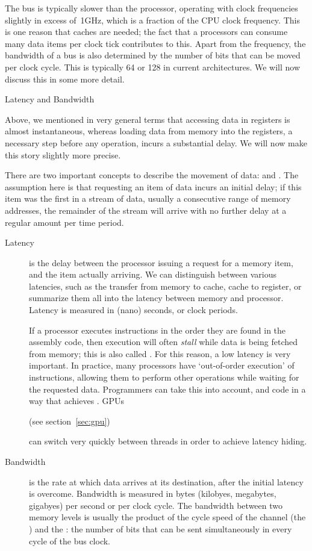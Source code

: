 The bus is typically slower than the processor, operating with clock
frequencies slightly in excess of~1GHz, which is a fraction of the CPU
clock frequency.  This is one reason that caches are needed; the fact
that a processors can consume many data items per clock tick
contributes to this. Apart from the frequency, the bandwidth of a bus is
also determined by the number of bits that can be moved per clock
cycle. This is typically 64 or 128 in current architectures. We will
now discuss this in some more detail.

 {Latency and Bandwidth}
\label{sec:latencybandwidth}

Above, we mentioned in very general terms that accessing data in
registers is almost instantaneous, whereas loading data from memory
into the registers, a necessary step before any operation, incurs a
substantial delay. We will now make this story slightly more precise.

There are two important concepts to describe the movement of data:
 and . The assumption here is
that requesting an item of data incurs an initial delay; if this item
was the first in a stream of data, usually a consecutive range of
memory addresses, the remainder of the stream will arrive with no
further delay
at a regular amount per time period.
\begin{description}
\item[Latency] is the delay between the processor issuing a request
  for a memory item, and the item actually arriving. We can
  distinguish between various latencies, such as the transfer from
  memory to cache, cache to register, or summarize them all into the
  latency between memory and processor. Latency is measured in (nano)
  seconds, or clock periods.

  If a processor executes instructions in the order they are found in
  the assembly code, then execution will often \emph{stall} while
  data is being fetched from memory; this is also called
  . For this reason, a low latency is very
  important. In practice, many processors have `out-of-order
  execution' of instructions, allowing them to perform other
  operations while waiting for the requested data. Programmers can
  take this into account, and code in a way that achieves
  . 
  \acp{GPU} 
\begin{gpu}
  (see section~\ref{sec:gpu})  
\end{gpu}
  can switch very quickly between threads in order to achieve latency hiding.
\item[Bandwidth] is the rate at which data arrives at its destination,
  after the initial latency is overcome. Bandwidth is measured in
  bytes (kilobyes, megabytes, gigabyes) per second or per clock cycle.
  The bandwidth between two memory levels is usually the product of
  the cycle speed of the channel (the ) and
  the : the number of bits that can be sent
  simultaneously in every cycle of the bus clock.
\end{description}

